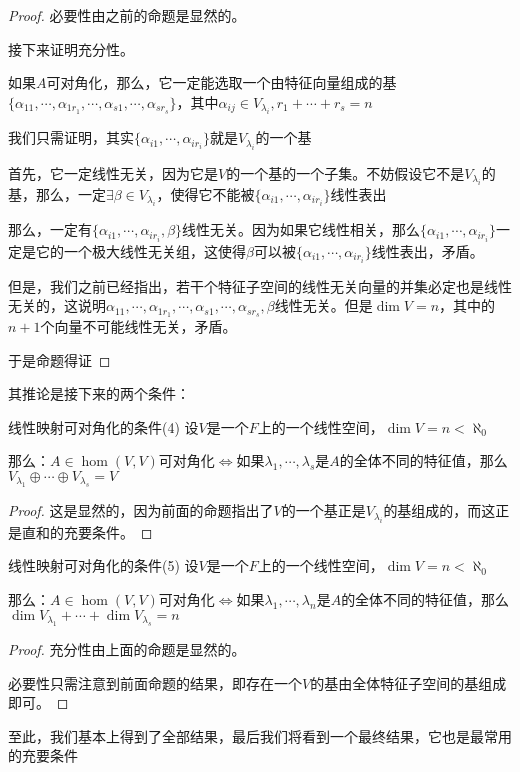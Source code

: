 \documentclass[12pt, a4paper, oneside, UTF8]{ctexbook}
\begin{document}
			\begin{proof}
				必要性由之前的命题是显然的。

				接下来证明充分性。

				如果$A$可对角化，那么，它一定能选取一个由特征向量组成的基$\{\alpha_{11},\cdots,\alpha_{1r_1},\cdots,\alpha_{s1},\cdots,\alpha_{sr_s}\}$，其中$\alpha_{ij}\in V_{\lambda_i},r_1+\cdots+r_s=n$

				我们只需证明，其实$\{\alpha _{i1},\cdots,\alpha_{ir_i}\}$就是$V_{\lambda_i}$的一个基

				首先，它一定线性无关，因为它是$V$的一个基的一个子集。不妨假设它不是$V_{\lambda_i}$的基，那么，一定$\exists \beta \in V_{\lambda_i}$，使得它不能被$\{\alpha _{i1},\cdots,\alpha_{ir_i}\}$线性表出

				那么，一定有$\{\alpha _{i1},\cdots,\alpha_{ir_i},\beta \}$线性无关。因为如果它线性相关，那么$\{\alpha _{i1},\cdots,\alpha_{ir_i}\}$一定是它的一个极大线性无关组，这使得$\beta $可以被$\{\alpha _{i1},\cdots,\alpha_{ir_i}\}$线性表出，矛盾。

				但是，我们之前已经指出，若干个特征子空间的线性无关向量的并集必定也是线性无关的，这说明$\alpha_{11},\cdots,\alpha_{1r_1},\cdots,\alpha_{s1},\cdots,\alpha_{sr_s},\beta $线性无关。但是$\dim V=n$，其中的$n+1$个向量不可能线性无关，矛盾。

				于是命题得证
			\end{proof}
			其推论是接下来的两个条件：
			\begin{corollary}{线性映射可对角化的条件(4)}{}
				设$V$是一个$F$上的一个线性空间，$\dim V = n < \aleph_0$

				那么：$A \in \hom(V,V)$可对角化$\Leftrightarrow $如果$\lambda_1,\cdots,\lambda_s$是$A$的全体不同的特征值，那么$V_{\lambda_1} \oplus \cdots \oplus V_{\lambda_s}=V$
			\end{corollary}
			\begin{proof}
				这是显然的，因为前面的命题指出了$V$的一个基正是$V_{\lambda_i}$的基组成的，而这正是直和的充要条件。
			\end{proof}
			\begin{corollary}{线性映射可对角化的条件(5)}
				设$V$是一个$F$上的一个线性空间，$\dim V = n < \aleph_0$

				那么：$A \in \hom(V,V)$可对角化$\Leftrightarrow $如果$\lambda_1,\cdots,\lambda_n$是$A$的全体不同的特征值，那么$\dim V_{\lambda_1}+\cdots+\dim V_{\lambda_s}=n$
			\end{corollary}
			\begin{proof}
				充分性由上面的命题是显然的。

				必要性只需注意到前面命题的结果，即存在一个$V$的基由全体特征子空间的基组成即可。
			\end{proof}
			至此，我们基本上得到了全部结果，最后我们将看到一个最终结果，它也是最常用的充要条件
\end{document}
